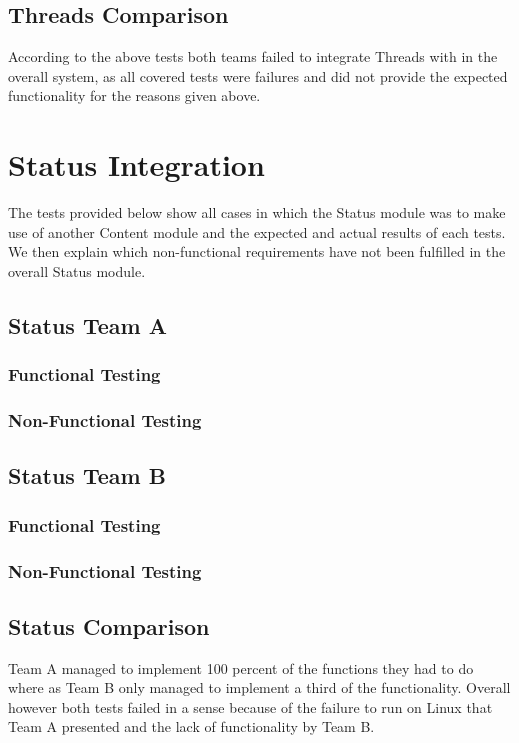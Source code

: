 \documentclass[12pt, oneside]{article}
\begin{document}
	\subsection{Threads Comparison}
	According to the above tests both teams failed to integrate Threads with in the overall system, as all covered tests were failures and did not provide the expected functionality for the reasons given above.
	
\newpage 
\section{Status Integration}
The tests provided below show all cases in which the Status module was to make use of another Content module and the expected and actual results of each tests. We then explain which non-functional requirements have not been fulfilled in the overall Status module.
	\subsection{Status Team A}	
		\subsubsection{Functional Testing}
			
		\subsubsection{Non-Functional Testing }
			
	
	\subsection{Status Team B}	
		\subsubsection{Functional Testing}
			
		\subsubsection{Non-Functional Testing }
			
	
	\subsection{Status Comparison}
	Team A managed to implement 100 percent of the functions they had to do where as Team B only managed to implement a third of the  functionality. Overall however both tests failed in a sense because of the failure to run on Linux that Team A presented and the lack of functionality by Team B.
	
\end{document}
